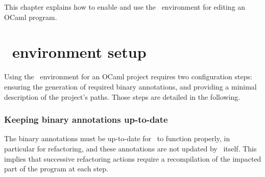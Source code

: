 

This chapter explains how to enable and use the \typerex\ environment
for editing an OCaml program.

\section{\typerex\ environment setup}

Using the \typerex\ environment for an OCaml project requires two
configuration steps: ensuring the generation of required binary
annotations, and providing a minimal description of the project's
paths. Those steps are detailed in the following.

\subsubsection*{Keeping binary annotations up-to-date}

The binary annotations must be up-to-date for \typerex\ to
function properly, in particular for refactoring, and these
annotations are not updated by \typerex\ itself. This implies that
successive refactoring actions require a recompilation of the impacted
part of the program at each step.

